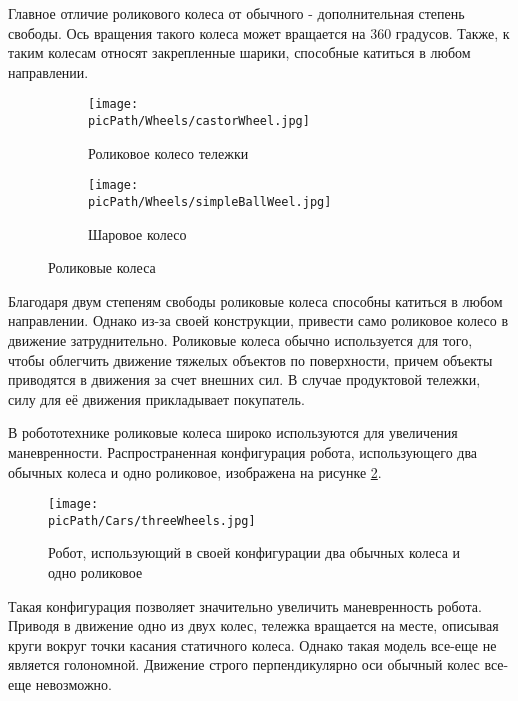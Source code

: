 \documentclass[oneside,final,14pt]{extreport}
\newcommand{\picPath}{img}
\begin{document}
Главное отличие роликового колеса от обычного - дополнительная степень свободы. Ось вращения такого колеса может вращается на $360$ градусов. Также, к таким колесам относят закрепленные шарики, способные катиться в любом направлении. 

\begin{figure}[H]
  \centering
  \begin{subfigure}[b]{0.4\linewidth}
   \texttt{[image: \\picPath/Wheels/castorWheel.jpg]}
    \caption{ Роликовое колесо тележки}
  \end{subfigure}
  \begin{subfigure}[b]{0.4\linewidth}
    \texttt{[image: \\picPath/Wheels/simpleBallWeel.jpg]}
    \caption{ Шаровое колесо }
  \end{subfigure}
  \caption{ Роликовые колеса}
  \label{Figure:CastorsWheels}
\end{figure}

Благодаря двум степеням свободы роликовые колеса способны катиться в любом направлении. Однако из-за своей конструкции, привести само роликовое колесо в движение затруднительно. Роликовые колеса обычно используется для того, чтобы облегчить движение тяжелых объектов по поверхности, причем объекты приводятся в движения за счет внешних сил. В случае продуктовой тележки, силу для её движения прикладывает покупатель.


В робототехнике роликовые колеса широко используются для увеличения маневренности. Распространенная конфигурация робота, использующего два обычных колеса и одно роликовое, изображена на рисунке \ref{Figure:threeWheelRobot}.
\begin{figure}[H]
\begin{center}
\texttt{[image: \\picPath/Cars/threeWheels.jpg]}
\end{center}
  \caption{ Робот, использующий в своей конфигурации два обычных колеса и одно роликовое}
  \label{Figure:threeWheelRobot}
\end{figure} 
Такая конфигурация позволяет значительно увеличить маневренность робота. Приводя в движение одно из двух колес, тележка вращается на месте, описывая круги вокруг точки касания статичного колеса. Однако такая модель все-еще не является голономной. Движение строго перпендикулярно оси обычный колес все-еще невозможно.
\end{document}
